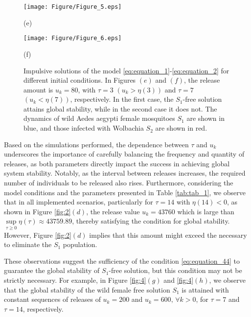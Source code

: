 \documentclass[10pt,letterpaper]{article}
\begin{document}
\begin{figure}[!ht]
    \centering
    \begin{minipage}{0.45\textwidth}
        \centering
        \texttt{[image: Figure/Figure\_5.eps]}
        \par\vspace{2pt} (e)
    \end{minipage}
    \hfill
    \begin{minipage}{0.45\textwidth}
        \centering
        \texttt{[image: Figure/Figure\_6.eps]}
        \par\vspace{2pt} (f)
    \end{minipage}
   \caption{Impulsive solutions of the model \eqref{eq:equation_1}-\eqref{eq:equation_2} for different initial conditions. In Figures $(e)$ and $(f)$, the release amount is $u_k = 80$, with $\tau = 3$ $(u_k>\eta(3))$ and $\tau = 7$ $(u_k<\eta(7))$, respectively. In the first case, the $S_1$-free solution attains global stability, while in the second case it does not. The dynamics of wild Aedes aegypti female mosquitoes $S_1$ are shown in blue, and those infected with Wolbachia $S_2$ are shown in red.}

    \label{fig:3}
\end{figure}

Based on the simulations performed, the dependence between $\tau$ and $u_k$ underscores the importance of carefully balancing the frequency and quantity of releases, as both parameters directly impact the success in achieving global system stability. Notably, as the interval between releases increases, the required number of individuals to be released also rises. Furthermore, considering the model conditions and the parameters presented in Table \eqref{tab:tab_1}, we observe that in all implemented scenarios, particularly for $\tau = 14$ with $\eta(14) < 0$, as shown in Figure \eqref{fig:2}$(d)$, the release value $u_k = 43760$ which is large than $\sup\limits_{\tau \geq 0} \eta(\tau) \approx 43759.89$, thereby satisfying the condition for global stability. However, Figure \eqref{fig:2}$(d)$ implies that this amount might exceed the necessary to eliminate the $S_1$ population.

These observations suggest the sufficiency of the condition \eqref{eq:equation_44} to guarantee the global stability of $S_1$-free solution, but this condition may not be strictly necessary. For example, in Figure \eqref{fig:4}$(g)$ and \eqref{fig:4}$(h)$, we observe that the global stability of the wild female free solution $S_1$ is attained with constant sequences of releases of $u_k = 200$ and $u_k = 600, \, \forall k > 0$, for $\tau = 7$ and $\tau = 14$, respectively.
\end{document}
